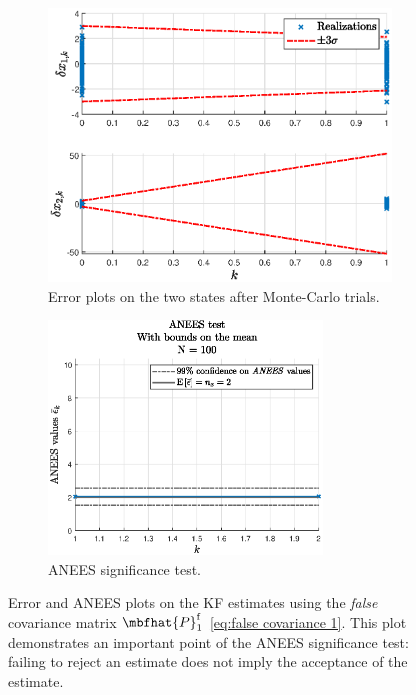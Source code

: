 \documentclass{simple-article}
\begin{document}
\begin{figure}[H]
  \centering
  \begin{subfigure}{0.45\textwidth}
    \includegraphics[width=\textwidth]{../figs/error_plots_N100_falseCovariance_scatter.eps}
    \caption{Error plots on the two states after Monte-Carlo trials.}
    \label{fig:error_plots_N100_falseCovariance_scatter}
  \end{subfigure}
  \begin{subfigure}{0.45\textwidth}
    \includegraphics[width=0.8\textwidth]{../figs/anees_N100_falseCovariance.eps}    
    \caption{ANEES significance test.}
    \label{fig:anees_N100_falseCovariance}
  \end{subfigure}
  \caption{Error and ANEES plots on the KF estimates using the \emph{false} covariance matrix $\mbfhat{P}_{1}^{\mathrm{f}}$ \eqref{eq:false covariance 1}. This plot demonstrates an important point of the ANEES significance test: failing to reject an estimate does not imply the acceptance of the estimate.}
  \label{fig:false covariance plots 1}
\end{figure}
\end{document}
